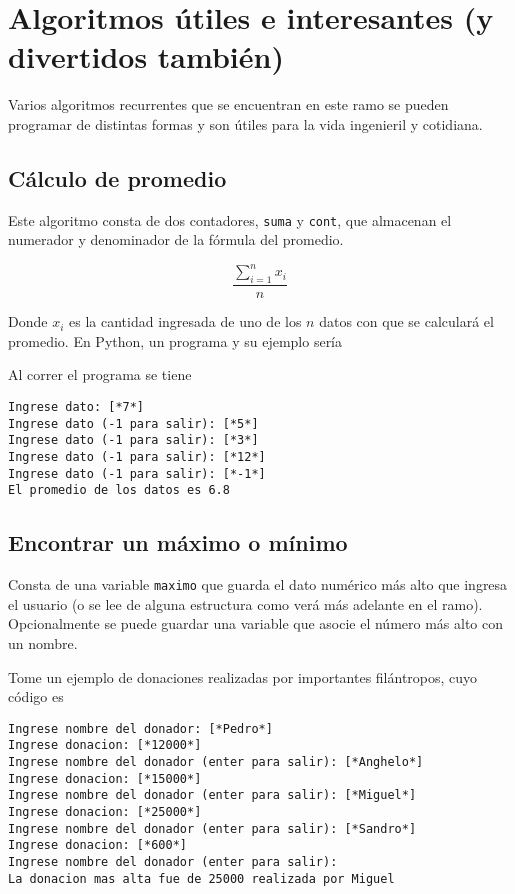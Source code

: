 \section{Algoritmos útiles e interesantes (y divertidos también)}

Varios algoritmos recurrentes que se encuentran en este ramo se pueden programar de distintas formas y son útiles para la vida ingenieril y cotidiana.

\subsection{Cálculo de promedio}

Este algoritmo consta de dos contadores, \texttt{suma} y \texttt{cont}, que almacenan el numerador y denominador de la fórmula del promedio.

$$ \frac{\sum_{i=1}^{n} x_{i}}{n} $$

Donde $x_i$ es la cantidad ingresada de uno de los $n$ datos con que se calculará el promedio. En Python, un programa y su ejemplo sería


    
    
Al correr el programa se tiene

\begin{lstlisting}[style=consola]
Ingrese dato: [*7*]
Ingrese dato (-1 para salir): [*5*]
Ingrese dato (-1 para salir): [*3*]
Ingrese dato (-1 para salir): [*12*]
Ingrese dato (-1 para salir): [*-1*]
El promedio de los datos es 6.8
\end{lstlisting}

\subsection{Encontrar un máximo o mínimo}

Consta de una variable \texttt{maximo} que guarda el dato numérico más alto que ingresa el usuario (o se lee de alguna estructura como verá más adelante en el ramo). Opcionalmente se puede guardar una variable que asocie el número más alto con un nombre. 

Tome un ejemplo de donaciones realizadas por importantes filántropos, cuyo código es

    

\begin{lstlisting}[style=consola]
Ingrese nombre del donador: [*Pedro*]
Ingrese donacion: [*12000*]
Ingrese nombre del donador (enter para salir): [*Anghelo*]
Ingrese donacion: [*15000*]
Ingrese nombre del donador (enter para salir): [*Miguel*]
Ingrese donacion: [*25000*]
Ingrese nombre del donador (enter para salir): [*Sandro*]
Ingrese donacion: [*600*]
Ingrese nombre del donador (enter para salir): 
La donacion mas alta fue de 25000 realizada por Miguel
\end{lstlisting}

